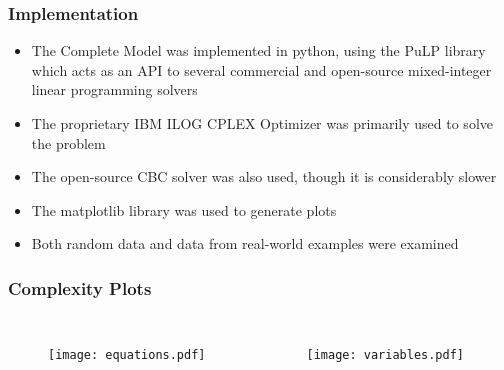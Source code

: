\documentclass{beamer}
\begin{document}
\begin{frame}
    \frametitle{Implementation}
    \begin{itemize}
        \item The Complete Model was implemented in python, using the PuLP
            library which acts as an API to several commercial and open-source
            mixed-integer linear programming solvers
        \item The proprietary IBM ILOG CPLEX Optimizer was primarily used to
            solve the problem
        \item The open-source CBC solver was also used, though it is
            considerably slower
        \item The matplotlib library was used to generate plots
        \item Both random data and data from real-world examples were examined
    \end{itemize}
\end{frame}


\begin{frame}
    \frametitle{Complexity Plots}
    \begin{columns}
        \begin{figure}
            \centering
            \texttt{[image: equations.pdf]}
        \end{figure}
        \begin{figure}
            \centering
            \texttt{[image: variables.pdf]}
        \end{figure}
    \end{columns}
\end{frame}
\end{document}
